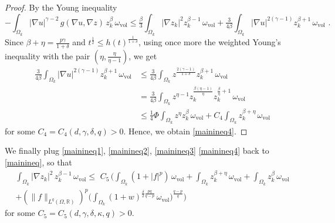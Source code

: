 \documentclass[10pt, a4paper, reqno, oneside]{amsart}
\theoremstyle{plain}
\theoremstyle{definition}
\theoremstyle{plain}
\theoremstyle{definition}
\theoremstyle{plain}
\renewcommand{\=}{:=}
\begin{document}
\begin{proof}
By the Young inequality
$$
-\int_{\Omega_k} |\nabla u|^{\gamma-2} \, g(\nabla u,\nabla z) \, z_k^{\beta} \, \omega_{\mathrm{vol}} \leq \tfrac{\beta}3 \int_{\Omega_k} |\nabla z_k|^2z_k^{\beta-1} \, \omega_{\mathrm{vol}} +\tfrac{3}{4\beta} \int_{\Omega_k} |\nabla u|^{2(\gamma-1)}z_k^{\beta+1} \, \omega_{\mathrm{vol}} \,\, .
$$
Since $\beta+\eta=\tfrac{p\gamma}{1+\delta}$ and $t^\frac12\leq h(t)^{\frac{1}{1+\delta}}$, using once more the weighted Young's inequality with the pair $(\eta,\frac{\eta}{\eta-1})$, we get 
$$\begin{aligned}
\tfrac{3}{4\beta} \int_{\Omega_k} |\nabla u|^{2(\gamma-1)} z_k^{\beta+1} \, \omega_{\mathrm{vol}} &\leq \tfrac{3}{4\beta} \int_{\Omega_k}z^{\frac{2(\gamma-1)}{1+\delta}} z_k^{\beta+1}\, \omega_{\mathrm{vol}} \\
&= \tfrac{3}{4\beta} \int_{\Omega_k} z^{\eta-1}z_k^{\frac{\beta(\eta-1)}{\eta}} z_k^{\frac{\beta}{\eta}+1}\, \omega_{\mathrm{vol}} \\
&\leq \tfrac14\Phi \int_{\Omega_k} z^{\eta}z_k^{\beta}\, \omega_{\mathrm{vol}} + C_4\int_{\Omega_k}z_k^{\beta+\eta}\, \omega_{\mathrm{vol}}
\end{aligned}$$
for some $C_4 = C_4(d,\gamma,\delta,q)>0$. Hence, we obtain \eqref{mainineq4}.
\end{proof}


We finally plug \eqref{mainineq1}, \eqref{mainineq2}, \eqref{mainineq3} \eqref{mainineq4} back to \eqref{mainineq}, so that 
\begin{multline} \label{mainineq5} 
\int_{\Omega_k} |\nabla z_k|^2\,z_k^{\beta-1}\, \omega_{\mathrm{vol}} \leq \,\,
 C_5\, \Bigg(\int_{\Omega_k} (1+|f|^p) \, \omega_{\mathrm{vol}} +\int_{\Omega_k}z_k^{\beta+\eta}\, \omega_{\mathrm{vol}} +\int_{\Omega_k} z_k^{\beta}\, \omega_{\mathrm{vol}} \\
+(\|f\|_{L^q(\Omega,\mathbb{R})})^p
\bigg(\int_{\Omega_k} (1+w)^{\frac{\delta}2\frac{pq}{q-p}} \, \omega_{\mathrm{vol}}\bigg)^{\frac{q-p}{q}}\Bigg)
\end{multline}
for some $C_5=C_5(d,\gamma,\delta,\kappa,q)>0$.
\end{document}
